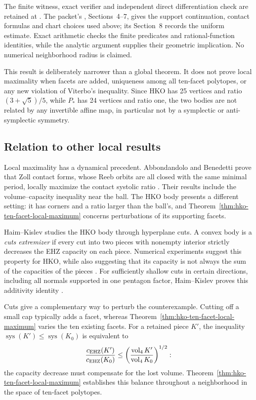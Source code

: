The finite witness, exact verifier and independent direct differentiation
check are retained at .
The packet's , Sections~4--7, gives the support continuation,
contact formulas and chart choices used above; its Section~8 records the
uniform estimate. Exact arithmetic checks the finite predicates and
rational-function identities, while the analytic argument supplies their
geometric implication. No numerical neighborhood radius is claimed.

This result is deliberately narrower than a global theorem. It does not
prove local maximality when facets are added, uniqueness among all ten-facet
polytopes, or any new violation of Viterbo's inequality. Since HKO has 25
vertices and ratio $(3+\sqrt5)/5$, while $P_*$ has 24 vertices and ratio one,
the two bodies are not related by any invertible affine map, in particular not
by a symplectic or anti-symplectic symmetry.

\subsection{Relation to other local results}
\label{subsec:hko-related-local-results}

Local maximality has a dynamical precedent. Abbondandolo and Benedetti
prove that Zoll contact forms, whose Reeb orbits are all closed with the
same minimal period, locally maximize the contact systolic ratio
\cite{AB2023}. Their results include the volume--capacity inequality near
the ball. The HKO body presents a different setting: it has corners and a
ratio larger than the ball's, and
Theorem~\ref{thm:hko-ten-facet-local-maximum} concerns perturbations of its
supporting facets.

Haim--Kislev studies the HKO body through hyperplane cuts. A convex body is
a \emph{cuts extremizer} if every cut into two pieces with nonempty interior
strictly decreases the EHZ capacity on each piece. Numerical experiments
suggest this property for HKO, while also suggesting that its capacity is
not always the sum of the capacities of the pieces
\cite[Definitions~1.1--1.2 and Example~1.12]{HaimKislev2025Zoll}.
For sufficiently shallow cuts in certain directions, including all normals
supported in one pentagon factor, Haim--Kislev proves this additivity identity
\cite[Proposition~1.13]{HaimKislev2025Zoll}.

Cuts give a complementary way to perturb the counterexample. Cutting off a
small cap typically adds a facet, whereas
Theorem~\ref{thm:hko-ten-facet-local-maximum} varies the ten existing
facets. For a retained piece $K'$, the inequality
$\operatorname{sys}(K')\leq\operatorname{sys}(K_0)$ is equivalent to
\[
 \frac{c_{\rm EHZ}(K')}{c_{\rm EHZ}(K_0)}
 \leq
 \left(\frac{\operatorname{vol}_4 K'}
 {\operatorname{vol}_4 K_0}\right)^{1/2}:
\]
the capacity decrease must compensate for the lost volume.
Theorem~\ref{thm:hko-ten-facet-local-maximum} establishes this balance
throughout a neighborhood in the space of ten-facet polytopes.
